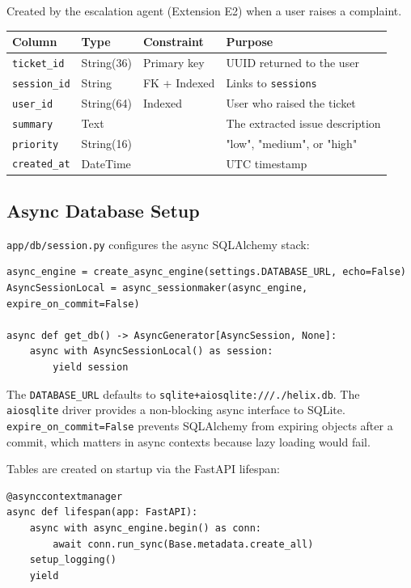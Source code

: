 \documentclass[12pt,a4paper]{article}
\begin{document}
Created by the escalation agent (Extension E2) when a user raises a complaint.

\begin{center}
\begin{tabular}{llll}
\toprule
\textbf{Column} & \textbf{Type} & \textbf{Constraint} & \textbf{Purpose} \\
\midrule
\texttt{ticket\_id} & String(36) & Primary key & UUID returned to the user \\
\texttt{session\_id} & String & FK + Indexed & Links to \texttt{sessions} \\
\texttt{user\_id} & String(64) & Indexed & User who raised the ticket \\
\texttt{summary} & Text & & The extracted issue description \\
\texttt{priority} & String(16) & & "low", "medium", or "high" \\
\texttt{created\_at} & DateTime & & UTC timestamp \\
\bottomrule
\end{tabular}
\end{center}

\subsection{Async Database Setup}

\texttt{app/db/session.py} configures the async SQLAlchemy stack:

\begin{lstlisting}[style=python]
async_engine = create_async_engine(settings.DATABASE_URL, echo=False)
AsyncSessionLocal = async_sessionmaker(async_engine, expire_on_commit=False)

async def get_db() -> AsyncGenerator[AsyncSession, None]:
    async with AsyncSessionLocal() as session:
        yield session
\end{lstlisting}

The \texttt{DATABASE\_URL} defaults to \texttt{sqlite+aiosqlite:///./helix.db}. The \texttt{aiosqlite} driver provides a non-blocking async interface to SQLite. \texttt{expire\_on\_commit=False} prevents SQLAlchemy from expiring objects after a commit, which matters in async contexts because lazy loading would fail.

Tables are created on startup via the FastAPI lifespan:

\begin{lstlisting}[style=python]
@asynccontextmanager
async def lifespan(app: FastAPI):
    async with async_engine.begin() as conn:
        await conn.run_sync(Base.metadata.create_all)
    setup_logging()
    yield
\end{lstlisting}
\end{document}
